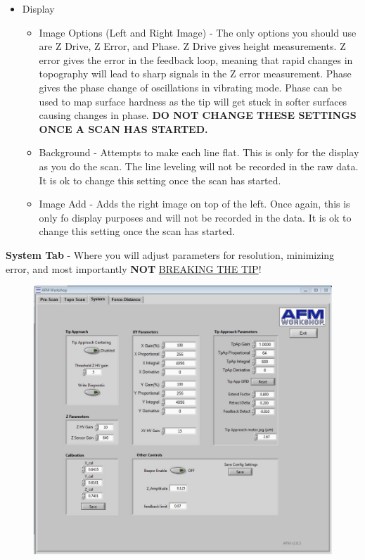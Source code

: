 \documentclass{../lab}
\begin{document}
\begin{itemize}
\begin{itemize}
    \end{itemize}

    \item Display

    \begin{itemize}
        \item Image Options (Left and Right Image) - The only options you should use are Z Drive, Z Error, and Phase. Z Drive gives height measurements. Z error gives the error in the feedback loop, meaning that rapid changes in topography will lead to sharp signals in the Z error measurement. Phase gives the phase change of oscillations in vibrating mode. Phase can be used to map surface hardness as the tip will get stuck in softer surfaces causing changes in phase. \textbf{DO NOT CHANGE THESE SETTINGS ONCE A SCAN HAS STARTED.}

        \item Background - Attempts to make each line flat. This is only for the display as you do the scan. The line leveling will not be recorded in the raw data. It is ok to change this setting once the scan has started.

        \item Image Add - Adds the right image on top of the left. Once again, this is only fo display purposes and will not be recorded in the data. It is ok to change this setting once the scan has started.

    \end{itemize}

\end{itemize}

\textbf{System Tab} - Where you will adjust parameters for resolution, minimizing error, and most importantly \textbf{NOT} \hyperref[subsec:BrokenTip]{BREAKING THE TIP}!
\begin{figure}[h]
    \centering
    \href{http://experimentationlab.berkeley.edu/sites/default/files/AFMImages/systemtab.JPG}{\includegraphics[width=0.5\linewidth]{images/systemtab.JPG}}
    \caption{}
    \label{fig:systemtab}
\end{figure}
\end{document}
